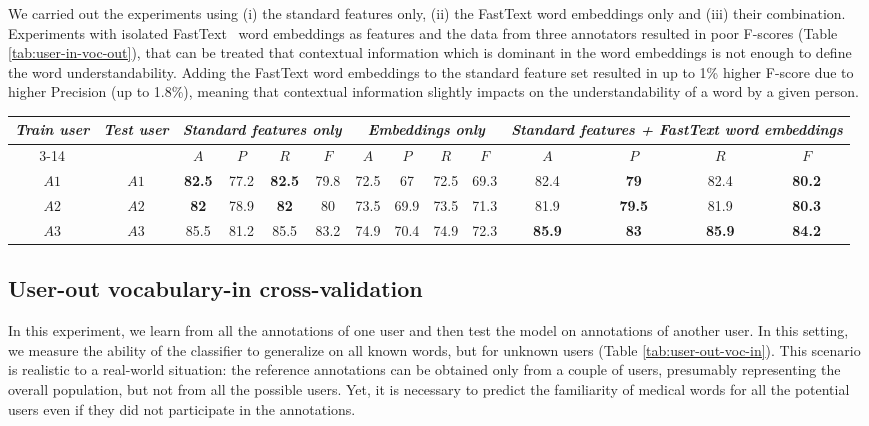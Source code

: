We carried out the experiments using (i) the standard features only, (ii) the FastText word embeddings only and (iii) their combination. Experiments with isolated FastText ~word embeddings as features and the data from three annotators resulted in poor F-scores (Table \ref{tab:user-in-voc-out}), that can be treated that contextual information which is dominant in the word embeddings is not enough to define the word understandability. Adding the FastText word embeddings to the standard feature set resulted in up to 1\% higher F-score due to higher Precision (up to 1.8\%), meaning that contextual information slightly impacts on the understandability of a word by a given person.

\begin{table*}[h]
\begin{tabular}{cc|cccc|cccc|cccc}
\multirow{2}{0.6cm}{\textit{Train user}} & \multirow{2}{0.6cm}{\textit{Test user}} & \multicolumn{4}{c|}{\textit{Standard features only}} & \multicolumn{4}{c|}{\textit{Embeddings only}} & \multicolumn{4}{X}{\textit{Standard features + FastText word embeddings}} \\ \cline{3-14} 
 &  & $A$ & $P$ & $R$ & $F$ & $A$ & $P$ & $R$ & $F$ & $A$ & $P$ & $R$ & $F$ \\ \hline
$A1$ & $A1$ & \textbf{82.5} & 77.2 & \textbf{82.5} & 79.8 & 72.5 & 67 & 72.5 & 69.3 & 82.4 & \textbf{79} & 82.4 & \textbf{80.2} \\
$A2$ & $A2$ & \textbf{82} & 78.9 & \textbf{82} & 80 & 73.5 & 69.9 & 73.5 & 71.3 & 81.9 & \textbf{79.5} & 81.9 & \textbf{80.3} \\ 
$A3$ & $A3$ & 85.5 & 81.2 & 85.5 & 83.2 & 74.9 & 70.4 & 74.9 & 72.3 & \textbf{85.9} & \textbf{83} & \textbf{85.9} & \textbf{84.2} \\ \hline 
\end{tabular}
    \caption{Experiments on user-in vocabulary-out cross-validation}
    \label{tab:user-in-voc-out}
\end{table*}


\subsection{User-out vocabulary-in cross-validation}

In this experiment, we learn from all the annotations of one user and then test the model on annotations of another user. In this setting, we measure the ability of the classifier to generalize on all known words, but for unknown users (Table \ref{tab:user-out-voc-in}). This scenario is realistic to a real-world situation: the reference annotations can be obtained only from a couple of users, presumably representing the overall population, but not from all the possible users. Yet, it is necessary to predict the familiarity of medical words for all the potential users even if they
did not participate in the annotations.

